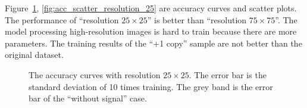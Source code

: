 \documentclass[12pt]{article}
\begin{document}
        Figure~\ref{fig:acc_curve_resolution_25}, \ref{fig:acc_scatter_resolution_25} are accuracy curves and scatter plots. The performance of ``resolution $25\times 25$'' is better than ``resolution $75\times 75$''. The model processing high-resolution images is hard to train because there are more parameters. The training results of the ``+1 copy'' sample are not better than the original dataset.
        \begin{figure}[htpb]
            \centering
            \caption{The accuracy curves with resolution $25\times 25$. The error bar is the standard deviation of 10 times training. The grey band is the error bar of the ``without signal'' case.}
            \label{fig:acc_curve_resolution_25}
        \end{figure}
\end{document}
